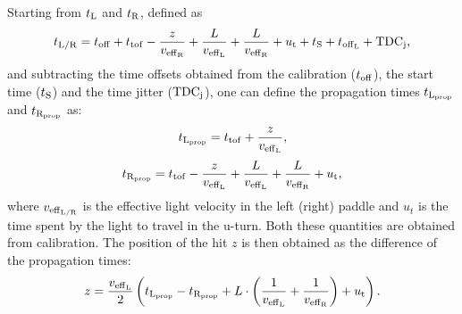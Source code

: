 Starting from $t_{\rm{L}}$ and $t_{\rm{R}}$, defined as
\begin{equation}\label{eq_time_hit}
t_{{\rm{L}}/{\rm{R}}}=t_{\rm{off}}+t_{\rm{tof}}-\frac{z}{v_{\rm{eff}_{\rm{R}}}}+\frac{L}{v_{\rm{eff}_L}}+\frac{L}{v_{\rm{eff}_{\rm{R}}}}+u_{\rm{t}}+t_{\rm{S}}+t_{\rm{off}_{\rm{L}}}+{\rm{TDC}}_{\rm{j}},
\end{equation}
and subtracting the time offsets obtained from the calibration ($t_{\rm{off}}$), the start time ($t_{\rm{S}}$) and the time jitter (${\rm{TDC}}_{\rm{j}}$), one can define the propagation times $t_{\rm{L}_{\rm{prop}}}$ and $t_{\rm{R}_{\rm{prop}}}$ as:
\begin{equation}
t_{\rm{L}_{\rm{prop}}}=t_{\rm{tof}}+\frac{z}{v_{\rm{eff}_{\rm{L}}}},
\end{equation}
\begin{equation}
t_{\rm{R}_{\rm{prop}}}=t_{\rm{tof}}-\frac{z}{v_{\rm{eff}_{\rm{L}}}}+\frac{L}{v_{\rm{eff}_{\rm{L}}}}+\frac{L}{v_{\rm{eff}_{\rm{R}}}}+u_{\rm{t}},
\end{equation}
where $v_{\rm{eff}_{\rm{L/R}}}$ is the effective light velocity in the left (right) paddle and $u_t$ is the time spent by the light to travel in the u-turn. Both these quantities are obtained from calibration.
The position of the hit $z$ is then obtained as the difference of the propagation times:
\begin{equation}
z=\frac{v_{\rm{eff}_{\rm{L}}}}{2} \left(t_{\rm{L}_{\rm{prop}}}-t_{\rm{R}_{\rm{prop}}}+ L \cdot \left(\frac{1}{v_{\rm{eff}_{\rm{L}}}}+\frac{1}{v_{\rm{eff}_{\rm{R}}}}\right)  +u_{\rm{t}}\right).
\end{equation}

